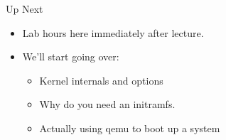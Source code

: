 \documentclass{../lecture}
\begin{document}
\begin{frame}{Up Next}
  \begin{itemize}
    \item Lab hours here immediately after lecture.
    \item We'll start going over:
      \begin{itemize}
        \item Kernel internals and options
        \item Why do you need an initramfs.
        \item Actually using qemu to boot up a system
      \end{itemize}
  \end{itemize}
\end{frame}
\end{document}
